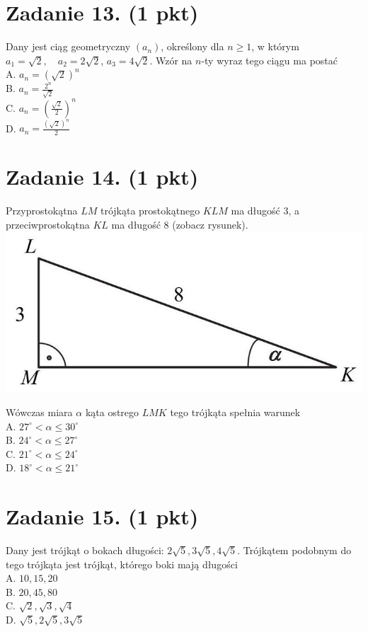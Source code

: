 \documentclass[10pt]{article}
\begin{document}
\section*{Zadanie 13. (1 pkt)}
Dany jest ciąg geometryczny \(\left(a_{n}\right)\), określony dla \(n \geq 1\), w którym \(a_{1}=\sqrt{2}, \quad a_{2}=2 \sqrt{2}\), \(a_{3}=4 \sqrt{2}\). Wzór na \(n\)-ty wyraz tego ciągu ma postać\\
A. \(a_{n}=(\sqrt{2})^{n}\)\\
B. \(a_{n}=\frac{2^{n}}{\sqrt{2}}\)\\
C. \(a_{n}=\left(\frac{\sqrt{2}}{2}\right)^{n}\)\\
D. \(a_{n}=\frac{(\sqrt{2})^{n}}{2}\)

\section*{Zadanie 14. (1 pkt)}
Przyprostokątna \(L M\) trójkąta prostokątnego \(K L M\) ma długość 3, a przeciwprostokątna \(K L\) ma długość 8 (zobacz rysunek).\\
\includegraphics[max width=\textwidth, center]{2024_11_21_9383c97fb44abf35abe9g-06}

Wówczas miara \(\alpha\) kąta ostrego \(L M K\) tego trójkąta spełnia warunek\\
A. \(27^{\circ}<\alpha \leq 30^{\circ}\)\\
B. \(24^{\circ}<\alpha \leq 27^{\circ}\)\\
C. \(21^{\circ}<\alpha \leq 24^{\circ}\)\\
D. \(18^{\circ}<\alpha \leq 21^{\circ}\)

\section*{Zadanie 15. (1 pkt)}
Dany jest trójkąt o bokach długości: \(2 \sqrt{5}, 3 \sqrt{5}, 4 \sqrt{5}\). Trójkątem podobnym do tego trójkąta jest trójkąt, którego boki mają długości\\
A. \(10,15,20\)\\
B. \(20,45,80\)\\
C. \(\sqrt{2}, \sqrt{3}, \sqrt{4}\)\\
D. \(\sqrt{5}, 2 \sqrt{5}, 3 \sqrt{5}\)
\end{document}
